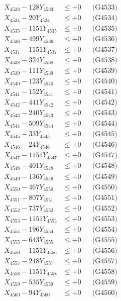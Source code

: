 \documentclass[a4paper,10pt]{article}
\begin{document}
{\begin{align}
X_{4533} - 128Y_{4533} &\leq +0 && \text{(G4533)} \\
X_{4534} - 20Y_{4534} &\leq +0 && \text{(G4534)} \\
X_{4535} - 1151Y_{4535} &\leq +0 && \text{(G4535)} \\
X_{4536} - 499Y_{4536} &\leq +0 && \text{(G4536)} \\
X_{4537} - 1151Y_{4537} &\leq +0 && \text{(G4537)} \\
X_{4538} - 324Y_{4538} &\leq +0 && \text{(G4538)} \\
X_{4539} - 111Y_{4539} &\leq +0 && \text{(G4539)} \\
X_{4540} - 123Y_{4540} &\leq +0 && \text{(G4540)} \\
\allowbreak
X_{4541} - 152Y_{4541} &\leq +0 && \text{(G4541)} \\
X_{4542} - 441Y_{4542} &\leq +0 && \text{(G4542)} \\
X_{4543} - 240Y_{4543} &\leq +0 && \text{(G4543)} \\
X_{4544} - 509Y_{4544} &\leq +0 && \text{(G4544)} \\
X_{4545} - 33Y_{4545} &\leq +0 && \text{(G4545)} \\
X_{4546} - 24Y_{4546} &\leq +0 && \text{(G4546)} \\
X_{4547} - 1151Y_{4547} &\leq +0 && \text{(G4547)} \\
X_{4548} - 401Y_{4548} &\leq +0 && \text{(G4548)} \\
X_{4549} - 136Y_{4549} &\leq +0 && \text{(G4549)} \\
X_{4550} - 467Y_{4550} &\leq +0 && \text{(G4550)} \\
\allowbreak
X_{4551} - 807Y_{4551} &\leq +0 && \text{(G4551)} \\
X_{4552} - 737Y_{4552} &\leq +0 && \text{(G4552)} \\
X_{4553} - 1151Y_{4553} &\leq +0 && \text{(G4553)} \\
X_{4554} - 196Y_{4554} &\leq +0 && \text{(G4554)} \\
X_{4555} - 643Y_{4555} &\leq +0 && \text{(G4555)} \\
X_{4556} - 1151Y_{4556} &\leq +0 && \text{(G4556)} \\
X_{4557} - 248Y_{4557} &\leq +0 && \text{(G4557)} \\
X_{4558} - 1151Y_{4558} &\leq +0 && \text{(G4558)} \\
X_{4559} - 535Y_{4559} &\leq +0 && \text{(G4559)} \\
X_{4560} - 94Y_{4560} &\leq +0 && \text{(G4560)} \\

\end{align}}
\end{document}
